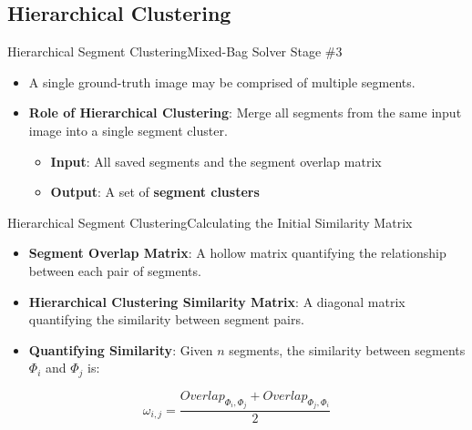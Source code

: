 \documentclass[10pt]{beamer}
\begin{document}
\subsection{Hierarchical Clustering}
\begin{frame}{Hierarchical Segment Clustering}{Mixed-Bag Solver Stage \#3}
  \begin{itemize}
    \item A single ground-truth image may be comprised of multiple segments.
    \vfill
    \item \textbf{Role of Hierarchical Clustering}: Merge all segments from the same input image into a single segment cluster.
    \begin{itemize}
      \vspace{0.4em}
      \item \textbf{Input}: All saved segments and the segment overlap matrix
  		\vspace{0.6em}
      \item \textbf{Output}: A set of {\color{spartanBlue}\textbf{segment clusters}}
    \end{itemize}
  \end{itemize}
\end{frame}



\begin{frame}{Hierarchical Segment Clustering}{Calculating the Initial Similarity Matrix}
  \begin{itemize}
    \item \textbf{Segment Overlap Matrix}: A hollow matrix quantifying the relationship between each pair of segments.
    \vspace{1em}
    \item \textbf{Hierarchical Clustering Similarity Matrix}: A diagonal matrix quantifying the similarity between segment pairs.
    \vspace{1em}
    \item \textbf{Quantifying Similarity}: Given $n$ segments, the similarity between segments $\Phi_i$ and $\Phi_j$ is:
  \end{itemize}
  \vspace{-1.5em}
  \begin{center}
    \begin{equation}
      \omega_{i,j} = \frac{Overlap_{\Phi_i, \Phi_j} + Overlap_{\Phi_j, \Phi_i}}{2} 
    \end{equation}
  \end{center}  
\end{frame}
\end{document}

